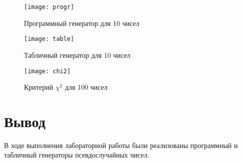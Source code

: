 \documentclass[a4paper, 14pt]{article}
\begin{document}
\begin{figure}[H]
    \texttt{[image: progr]}
    \caption{Программный генератор для 10 чисел}
    \label{fig:}
\end{figure}

\begin{figure}[H]
    \texttt{[image: table]}
    \caption{Табличный генератор для 10 чисел}
    \label{fig:}
\end{figure}

\begin{figure}[H]
    \texttt{[image: chi2]}
    \caption{Критерий $\chi^2$  для 100 чисел}
    \label{fig:}
\end{figure}


\section*{Вывод}
В ходе выполнения лабораторной работы были реализованы программный и табличный генераторы псевдослучайных чисел.
\end{document}
